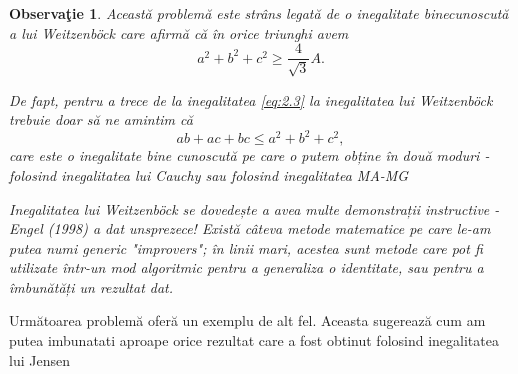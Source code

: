 \documentclass[a4paper,12pt,oneside]{report}
\newtheorem{remark}{Observa\c{t}ie}
\begin{document}
\begin{remark}
Această problemă este strâns legată de o inegalitate binecunoscută a lui Weitzenböck care afirmă că în orice triunghi avem
\begin{displaymath}
  a^{2} + b^{2} + c^{2} \geq \frac{4}{\sqrt{3}}A. \label{eq:2.4} \tag{2.4}
\end{displaymath}

De fapt, pentru a trece de la inegalitatea \ref{eq:2.3} la inegalitatea lui Weitzenböck trebuie doar să ne amintim că
\begin{displaymath}
  ab + ac + bc \leq a^{2} + b^{2} + c^{2},
\end{displaymath}
care este o inegalitate bine cunoscută pe care o putem obține în două moduri  - folosind inegalitatea lui Cauchy sau folosind inegalitatea MA-MG

	Inegalitatea lui Weitzenböck se dovedește a avea multe demonstrații instructive - Engel (1998) a dat unsprezece!
Există câteva metode matematice pe care le-am putea numi generic "improvers"; în linii mari, acestea sunt metode care pot fi utilizate într-un mod algoritmic pentru a generaliza o identitate, sau pentru a îmbunătăți un rezultat dat.
\end{remark}
Următoarea problemă oferă un exemplu de alt fel. Aceasta sugerează cum am putea imbunatati aproape orice rezultat care a fost obtinut folosind inegalitatea lui Jensen
\end{document}
